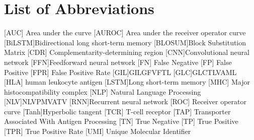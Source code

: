 \section*{List of Abbreviations}
\begin{acronym}

[AUC] {Area under the curve}
[AUROC] {Area under the receiver operator curve}
[BiLSTM]{Bidirectional long short-term memory}
[BLOSUM]{Block Substitution Matrix}
[CDR] {Complementarity-determining region}
[CNN]{Convolutional neural network}
[FFN]{Feedforward neural network}
[FN] {False Negative}
[FP] {False Positive}
[FPR] {False Positive Rate}
[GIL]{GILGFVFTL}
[GLC]{GLCTLVAML}
[HLA] {human leukocyte antigen}
[LSTM]{Long short-term memory}
[MHC] {Major histocompatibility complex}
[NLP] {Natural Language Processing}
[NLV]{NLVPMVATV}
[RNN]{Recurrent neural network}
[ROC] {Receiver operator curve}
[Tanh]{Hyperbolic tangent}
   [TCR]   {T-cell receptor}
[TAP] {Transporter Associated With Antigen Processing}
[TN] {True Negative}
[TP] {True Positive}
[TPR] {True Positive Rate}
[UMI] {Unique Molecular Identifier}
  
\end{acronym}

